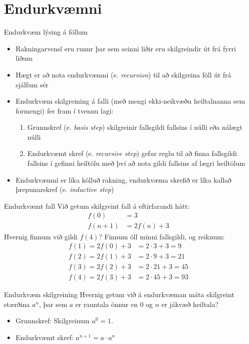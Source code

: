 \documentclass[handout]{beamer}
\begin{document}
\section{Endurkvæmni}

\begin{frame}{Endurkvæm lýsing á föllum}
\begin{itemize}
 \item Rakningarvensl eru runur þar sem seinni liðir eru skilgreindir út frá fyrri liðum
 \item Hægt er að nota endurkvæmni (e. \emph{recursion}) til að skilgreina föll út frá sjálfum sér
 \item Endurkvæm skilgreining á falli (með mengi ekki-neikvæðu heiltalnanna sem formengi) fer fram í tvennu lagi:
 \begin{enumerate}
  \item Grunnskref (e. \emph{basis step}) skilgreinir fallsgildi fallsins í núlli eða nálægt núlli
  \item Endurkvæmt skref (e. \emph{recursive step}) gefur reglu til að finna fallsgildi fallsins í gefinni heiltölu með því að nota gildi fallsins af lægri heiltölum
 \end{enumerate}
 \item Endurkvæmni er líka kölluð rakning, endurkvæma skrefið er líka kallað þrepunarskref (e. \emph{inductive step})
\end{itemize}
\end{frame}

\begin{frame}{Endurkvæmt fall}
Við getum skilgreint fall á eftirfarandi hátt:
\begin{align*}
f(0) &= 3\\
f(n+1) &= 2f(n) + 3
\end{align*}
Hvernig finnum við gildi $f(4)$? \pause Finnum öll minni fallsgildi, og reiknum:
\begin{align*}
f(1) = 2f(0) + 3 &= 2 \cdot 3 + 3 = 9\\
f(2) = 2f(1) + 3 &= 2 \cdot 9 + 3 = 21\\
f(3) = 2f(2) + 3 &= 2 \cdot 21 + 3 = 45\\
f(4) = 2f(3) + 3 &= 2 \cdot 45 + 3 = 93
\end{align*}
\end{frame}

\begin{frame}{Endurkvæm skilgreining}
Hvernig getum við á endurkvæman máta skilgreint stærðina $a^n$, þar sem $a$ er rauntala önnur en $0$ og $n$ er jákvæð heiltala?
\pause
\begin{itemize}
 \item Grunnskref: Skilgreinum $a^0 = 1$.
 \item Endurkvæmt skref: $a^{n+1} = a \cdot a^n$
\end{itemize}
\end{frame}
\end{document}
